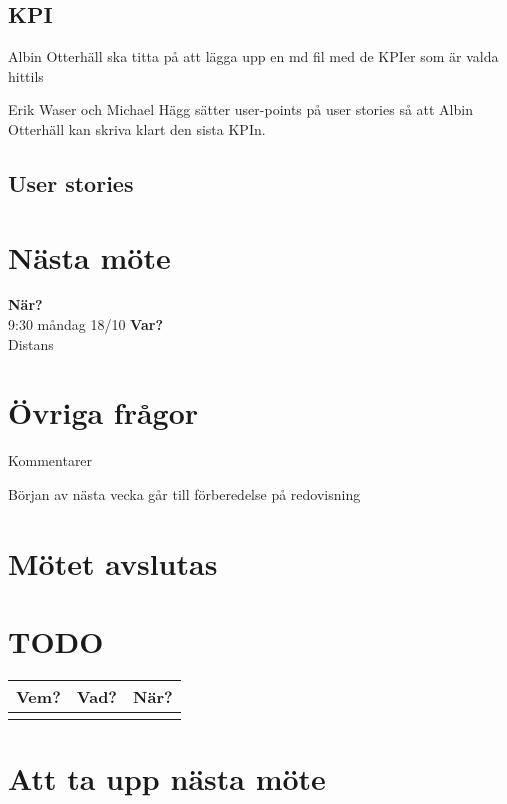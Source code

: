 \documentclass[9pt]{article}
\newcommand{\Waser}{Erik Waser\xspace}
\newcommand{\Slaget}{Albin Otterhäll\xspace}
\newcommand{\Kim}{Michael Hägg\xspace}
\begin{document}
\subsection{KPI}
\Slaget ska titta på att lägga upp en md fil med de KPIer som är valda hittils

\Waser och \Kim sätter user-points på user stories så att \Slaget kan skriva klart den sista KPIn.

\subsection{User stories}

\section{Nästa möte}
\textbf{När?} \\ 9:30 måndag 18/10
\textbf{Var?} \\ Distans

\section{Övriga frågor}
Kommentarer 

Början av nästa vecka går till förberedelse på redovisning

\section{Mötet avslutas}


\appendix
\section{TODO}
\begin{tabular}{| p{3cm} | p{7.5cm} | p{3cm}|}
  \hline
  \textbf{Vem?} & \textbf{Vad?} & \textbf{När?} \\ \hline
  \textbf{} & \textbf{} & \textbf{} \\ \hline


  \end{tabular}
\section{Att ta upp nästa möte}
\end{document}

